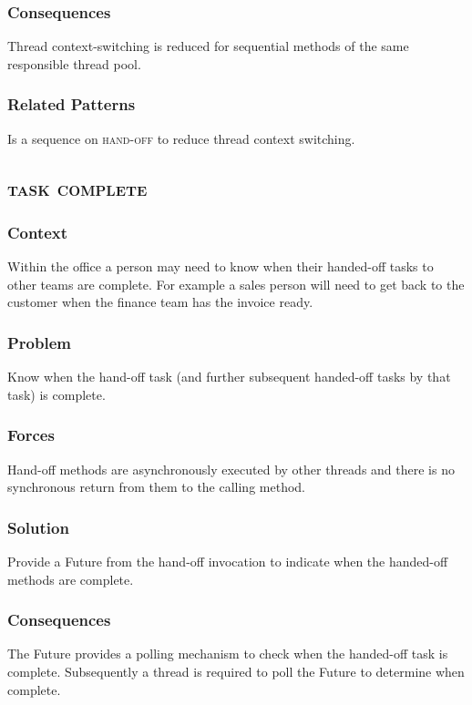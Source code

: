 \documentclass[prodmode]{style/acmlarge}
\begin{document}
\subsubsection*{Consequences} Thread context-switching is reduced for sequential
methods of the same responsible thread pool.

\subsubsection*{Related Patterns} Is a sequence on \textsc{hand-off} to reduce
thread context switching.



\subsection{\textsc{\textbf{task complete}}}

\subsubsection*{Context} Within the office a person may need to know when their
handed-off tasks to other teams are complete.  For example a sales person will
need to get back to the customer when the finance team has the invoice ready.

\subsubsection*{Problem} Know when the hand-off task (and further subsequent
handed-off tasks by that task) is complete.

\subsubsection*{Forces} Hand-off methods are asynchronously executed by other
threads and there is no synchronous return from them to the calling method.

\subsubsection*{Solution} Provide a Future from the hand-off invocation to
indicate when the handed-off methods are complete.

\subsubsection*{Consequences} The Future provides a polling mechanism to check
when the handed-off task is complete.  Subsequently a thread is required to
poll the Future to determine when complete.
\end{document}
